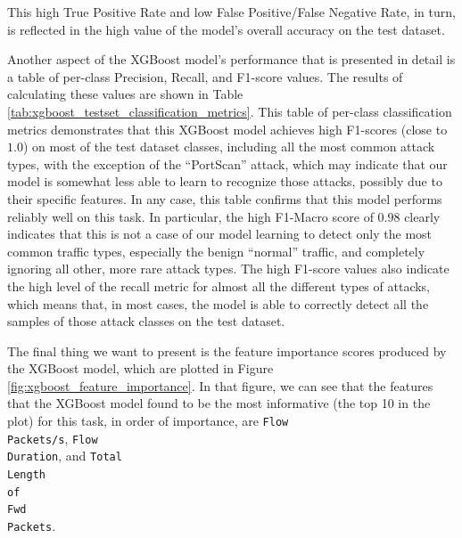 This high True Positive Rate and low False Positive/False Negative Rate, in turn, is reflected in the high value of the model’s overall accuracy on the test dataset.

Another aspect of the XGBoost model’s performance that is presented in detail is a table of per-class Precision, Recall, and F1-score values. The results of calculating these values are shown in Table \ref{tab:xgboost_testset_classification_metrics}. This table of per-class classification metrics demonstrates that this XGBoost model achieves high F1-scores (close to $1.0$) on most of the test dataset classes, including all the most common attack types, with the exception of the “PortScan” attack, which may indicate that our model is somewhat less able to learn to recognize those attacks, possibly due to their specific features. In any case, this table confirms that this model performs reliably well on this task. In particular, the high F1-Macro score of $0.98$ clearly indicates that this is not a case of our model learning to detect only the most common traffic types, especially the benign “normal” traffic, and completely ignoring all other, more rare attack types. The high F1-score values also indicate the high level of the recall metric for almost all the different types of attacks, which means that, in most cases, the model is able to correctly detect all the samples of those attack classes on the test dataset.

The final thing we want to present is the feature importance scores produced by the XGBoost model, which are plotted in Figure \ref{fig:xgboost_feature_importance}. In that figure, we can see that the features that the XGBoost model found to be the most informative (the top 10 in the plot) for this task, in order of importance, are \texttt{Flow\\ Packets/s}, \texttt{Flow\\ Duration}, and \texttt{Total\\ Length\\ of\\ Fwd\\ Packets}.


